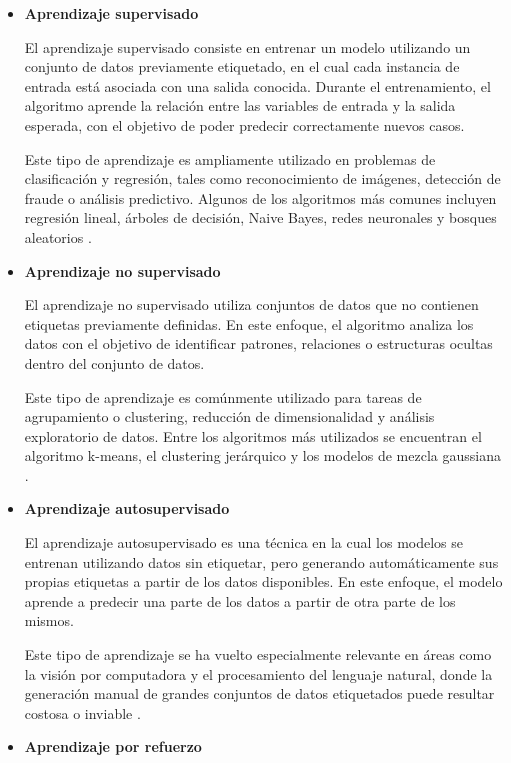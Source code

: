 \begin{itemize}

\item \textbf{Aprendizaje supervisado}

El aprendizaje supervisado consiste en entrenar un modelo utilizando un conjunto de datos previamente etiquetado, en el cual cada instancia de entrada está asociada con una salida conocida. Durante el entrenamiento, el algoritmo aprende la relación entre las variables de entrada y la salida esperada, con el objetivo de poder predecir correctamente nuevos casos.

Este tipo de aprendizaje es ampliamente utilizado en problemas de clasificación y regresión, tales como reconocimiento de imágenes, detección de fraude o análisis predictivo. Algunos de los algoritmos más comunes incluyen regresión lineal, árboles de decisión, Naive Bayes, redes neuronales y bosques aleatorios \cite{ibm2025_mltypes}.

\item \textbf{Aprendizaje no supervisado}

El aprendizaje no supervisado utiliza conjuntos de datos que no contienen etiquetas previamente definidas. En este enfoque, el algoritmo analiza los datos con el objetivo de identificar patrones, relaciones o estructuras ocultas dentro del conjunto de datos.

Este tipo de aprendizaje es comúnmente utilizado para tareas de agrupamiento o clustering, reducción de dimensionalidad y análisis exploratorio de datos. Entre los algoritmos más utilizados se encuentran el algoritmo k-means, el clustering jerárquico y los modelos de mezcla gaussiana \cite{ibm2025_mltypes}.

\item \textbf{Aprendizaje autosupervisado}

El aprendizaje autosupervisado es una técnica en la cual los modelos se entrenan utilizando datos sin etiquetar, pero generando automáticamente sus propias etiquetas a partir de los datos disponibles. En este enfoque, el modelo aprende a predecir una parte de los datos a partir de otra parte de los mismos.

Este tipo de aprendizaje se ha vuelto especialmente relevante en áreas como la visión por computadora y el procesamiento del lenguaje natural, donde la generación manual de grandes conjuntos de datos etiquetados puede resultar costosa o inviable \cite{ibm2025_mltypes}.


\item \textbf{Aprendizaje por refuerzo}


\end{itemize}

